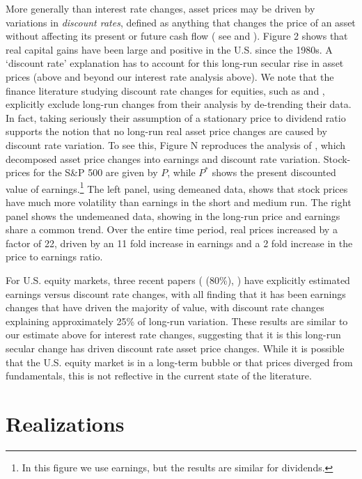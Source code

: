 \documentclass[12pt]{article}
\begin{document}
More generally than interest rate changes, asset prices may be driven by variations in \textit{discount rates}, defined as anything that changes the price of an asset without affecting its present or future cash flow ( see \citet{fagereng2025asset} and \citet{aguiar2024putting}). Figure 2 shows that real capital gains have been large and positive in the U.S. since the 1980s. A `discount rate' explanation has to account for this long-run secular rise in asset prices (above and beyond our interest rate analysis above). We note that the finance literature studying discount rate changes for equities, such as \citet{shiller1981stock} and \citet{campbell1988dividend}, explicitly exclude long-run changes from their analysis by de-trending their data. In fact, taking seriously their assumption of a stationary price to dividend ratio supports the notion that no long-run real asset price changes are caused by discount rate variation. To see this, Figure N reproduces the analysis of \citet{shiller1981stock}, which decomposed asset price changes into earnings and discount rate variation. Stock-prices for the S\&P 500 are given by $P$, while $P^*$ shows the present discounted value of earnings.\footnote{In this figure we use earnings, but the results are similar for dividends.} The left panel, using demeaned data, shows that stock prices have much more volatility than earnings in the short and medium run. The right panel shows the undemeaned data, showing in the long-run price and earnings share a common trend. Over the entire time period, real prices increased by a factor of 22, driven by an 11 fold increase in earnings and a 2 fold increase in the price to earnings ratio.

For U.S. equity markets, three recent papers (\citet{eeckhout2024value} (80\%), \citet{greenwald2025wealth} \citet{atkeson2025reconciling}) have explicitly estimated earnings versus discount rate changes, with all finding that it has been earnings changes that have driven the majority of value, with discount rate changes explaining approximately 25\% of long-run variation. These results are similar to our estimate above for interest rate changes, suggesting that it is this long-run secular change has driven discount rate asset price changes. While it is possible that the U.S. equity market is in a long-term bubble or that prices diverged from fundamentals, this is not reflective in the current state of the literature. 

\section{Realizations}
\end{document}
